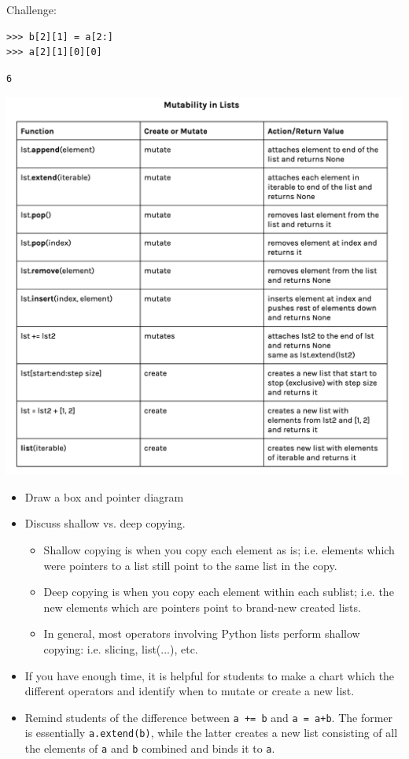 Challenge:
\begin{lstlisting}
>>> b[2][1] = a[2:]
>>> a[2][1][0][0]
\end{lstlisting}
\begin{solution}[0.25in]
\begin{lstlisting}
6
\end{lstlisting}

\includegraphics[width=.9\textwidth]{list-mutation.png}

\end{solution}

\begin{blocksection}
	\begin{guide}
	\begin{itemize}
		\item Draw a box and pointer diagram
		\item Discuss shallow vs. deep copying. 
		\begin{itemize}
			\item Shallow copying is when you copy each element as is; i.e. elements which were pointers to a list still point to the same list in the copy.
			\item Deep copying is when you copy each element within each sublist; i.e. the new elements which are pointers point to brand-new created lists.
			\item In general, most operators involving Python lists perform shallow copying: i.e. slicing, list(...), etc.
		\end{itemize}
		\item If you have enough time, it is helpful for students to make a chart which the different operators and identify when to mutate or create a new list.
		\item Remind students of the difference between \lstinline{a += b} and \lstinline{a = a+b}. The former is essentially \lstinline{a.extend(b)}, while the latter creates a new list consisting of all the elements of \lstinline{a} and \lstinline{b} combined and binds it to \lstinline{a}.
	\end{itemize}
	\end{guide}
\end{blocksection}
	
